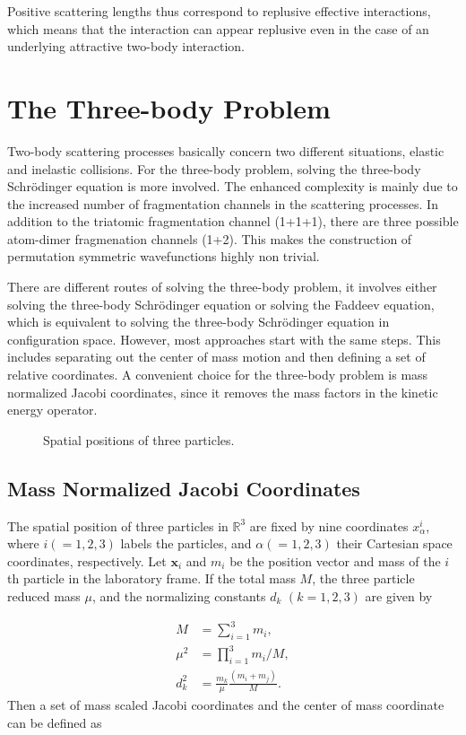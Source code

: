 \documentclass{article}
\numberwithin{equation}{section}
\numberwithin{figure}{section}
\begin{document}
Positive scattering lengths thus correspond to replusive effective interactions, which means that the interaction can appear replusive even in the case of an underlying attractive two-body interaction.

\section{The Three-body Problem} 
Two-body scattering processes basically concern two different situations, elastic and inelastic collisions. For the three-body problem, solving the three-body Schr{\"o}dinger equation is more involved. The enhanced complexity is mainly due to the increased number of fragmentation channels in the scattering processes. In addition to the triatomic fragmentation channel (1+1+1), there are three possible atom-dimer fragmenation channels (1+2). This makes the construction of permutation symmetric wavefunctions highly non trivial. 

There are different routes of solving the three-body problem, it involves either solving the three-body Schr{\"o}dinger equation or solving the Faddeev equation, which is equivalent to solving the three-body Schr{\"o}dinger equation in configuration space. However, most approaches start with the same steps. This includes separating out the center of mass motion and then defining a set of relative  coordinates. A convenient choice for the three-body problem is mass normalized Jacobi coordinates, since it removes the mass factors in the kinetic energy operator.     

\begin{figure}
	\centering
	
	\caption{Spatial positions of three particles.}
	\label{fig:1}
\end{figure}

\subsection{Mass Normalized Jacobi Coordinates}
The spatial position of three particles in $\mathbb{R}^3$ are fixed by nine coordinates $x_{\alpha}^{i}$, where $i(=1,2,3)$ labels the particles, and $\alpha(=1,2,3)$ their Cartesian space coordinates, respectively. Let $\mathbf{x}_i$ and $m_{i}$ be the position vector and mass of the $i$th particle in the laboratory frame. If the total mass $M$, the three particle reduced mass $\mu$, and the normalizing constants $d_{k}$ $(k=1,2,3)$ are given by

\begin{align}
M &= \sum_{i=1}^{3}m_i,  \label{eq:3,1} \\
\mu^2 &= \prod_{i=1}^{3}m_i/M,  \label{eq:3,2}\\
d_k^2 &= \frac{m_k}{\mu}\frac{(m_i+m_j)}{M}.  \label{eq:3,3}
\end{align}
Then a set of mass scaled Jacobi coordinates and the center of mass coordinate can be defined as
\end{document}
